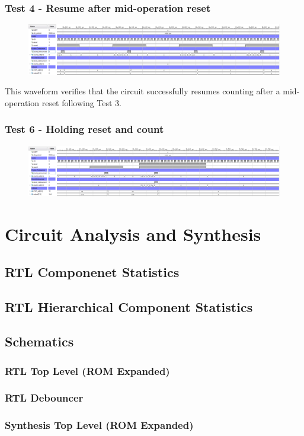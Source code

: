 \documentclass[11pt]{report}
\begin{document}
\subsubsection*{Test 4 - Resume after mid-operation reset}
\begin{figure}[H]
    \includegraphics[width=\columnwidth]{Reports/Lab1/Waveforms/07_resume-after-mid-operation-reset.png}
\end{figure}
This waveform verifies that the circuit successfully resumes counting after a mid-operation reset following Test 3.

\subsubsection*{Test 6 - Holding reset and count}
\begin{figure}[H]
    \includegraphics[width=\columnwidth]{Reports/Lab1/Waveforms/08_holding-reset-and-count.png}
\end{figure}

\section*{Circuit Analysis and Synthesis}

\subsection*{RTL Componenet Statistics}

\subsection*{RTL Hierarchical Component Statistics}

\subsection*{Schematics}

\subsubsection*{RTL Top Level (ROM Expanded)}

\subsubsection*{RTL Debouncer}

\subsubsection*{Synthesis Top Level (ROM Expanded)}
\end{document}
